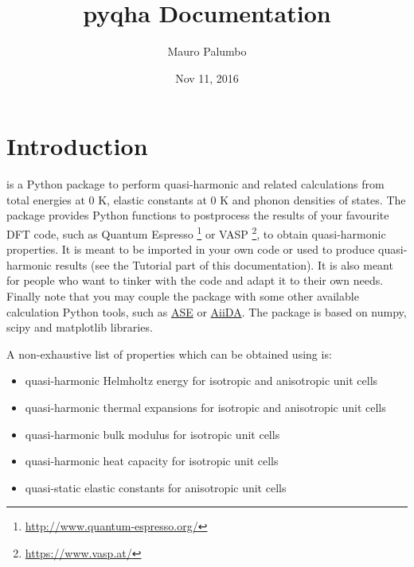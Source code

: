 \documentclass[letterpaper,10pt,english]{sphinxmanual}
\title{pyqha Documentation}
\date{Nov 11, 2016}
\author{Mauro Palumbo}
\begin{document}
\maketitle
\tableofcontents
{}\label{index::doc}



\chapter{Introduction}
\label{introduction:introduction}\label{introduction:welcome-to-pyqha-s-documentation}\label{introduction::doc}\label{introduction:id1}
 is a Python package to perform quasi-harmonic and related calculations from total energies at 0 K, elastic constants at 0 K and phonon densities of states. The package provides Python functions to postprocess the results of your favourite DFT code, such as Quantum Espresso \footnote[1]{\sphinxAtStartFootnote
\url{http://www.quantum-espresso.org/}
} or VASP \footnote[2]{\sphinxAtStartFootnote
\url{https://www.vasp.at/}
}, to obtain quasi-harmonic properties. It is meant to be imported in your own code or used to produce quasi-harmonic results (see the Tutorial part of this documentation). It is also meant for people who want to tinker with the code and adapt it to their own needs. Finally note that you may couple the package with some other available calculation Python tools, such as \href{https://wiki.fysik.dtu.dk/ase/about.html}{ASE} or \href{http://www.aiida.net/}{AiiDA}.
The package is based on numpy, scipy and matplotlib libraries.

A non-exhaustive list of properties which can be obtained using  is:
\begin{itemize}
\item {} 
quasi-harmonic Helmholtz energy for isotropic and anisotropic unit cells

\item {} 
quasi-harmonic thermal expansions for isotropic and anisotropic unit cells

\item {} 
quasi-harmonic bulk modulus for isotropic unit cells

\item {} 
quasi-harmonic heat capacity for isotropic unit cells

\item {} 
quasi-static elastic constants for anisotropic unit cells

\end{itemize}
\end{document}
